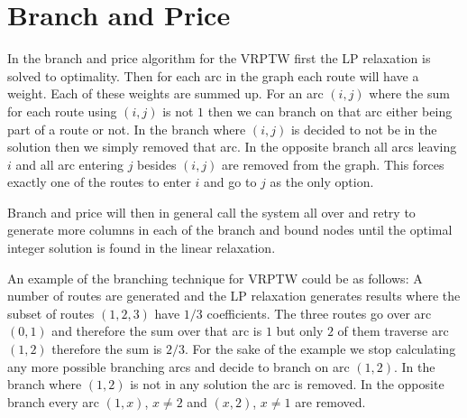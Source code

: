 \section{Branch and Price}
In the branch and price algorithm for the VRPTW first the LP relaxation is solved to optimality. Then for each arc in the graph each route will have a weight. Each of these weights are summed up. For an arc $(i,j)$ where the sum for each route using $(i,j)$ is not $1$ then we can branch on that arc either being part of a route or not. In the branch where $(i,j)$ is decided to not be in the solution then we simply removed that arc. In the opposite branch all arcs leaving $i$ and all arc entering $j$ besides $(i,j)$ are removed from the graph. This forces exactly one of the routes to enter $i$ and go to $j$ as the only option. 

Branch and price will then in general call the system all over and retry to generate more columns in each of the branch and bound nodes until the optimal integer solution is found in the linear relaxation.

\newpar An example of the branching technique for VRPTW could be as follows: A number of routes are generated and the LP relaxation generates results where the subset of routes $(1,2,3)$ have $1/3$ coefficients. The three routes go over arc $(0,1)$ and therefore the sum over that arc is $1$ but only $2$ of them traverse arc $(1,2)$ therefore the sum is $2/3$. For the sake of the example we stop calculating any more possible branching arcs and decide to branch on arc $(1,2)$. In the branch where $(1,2)$ is not in any solution the arc is removed. In the opposite branch every arc $(1, x)$, $x\neq 2$ and $(x,2)$, $x\neq 1$ are removed.
